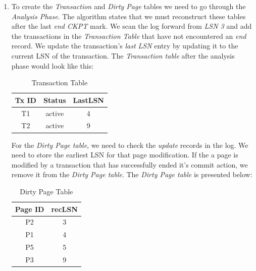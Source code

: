 \documentclass{article}      %
\begin{document}
\begin{enumerate}
\item %

To create the \emph{Transaction} and \emph{Dirty Page} tables we need to go through the \emph{Analysis Phase}. The algorithm states that we must reconstruct these tables after the last \emph{end CKPT} mark. We scan the log forward from \emph{LSN 3} and add the transactions in the \emph{Transaction Table} that have not encountered an \emph{end} record. We update the transaction's  \emph{last LSN} entry by updating it to the current LSN of the transaction. The \emph{Transaction table} after the analysis phase would look like this: \\

\begin{table}[h]
\begin{center}
\begin{tabular}{|c|c|c|}
\hline
\textbf{Tx ID} & \textbf{Status} & \textbf{LastLSN} \\ \hline
T1             & active          & 4                \\ 
T2             & active          & 9                \\ \hline
\end{tabular}
\caption{Transaction Table}
\label{Transaction Table}
\end{center}
\end{table}

For the \emph{Dirty Page table}, we need to check the \emph{update} records in the log. We need to store the earliest LSN for that page modification. If the a page is modified by a transaction that has successfully ended it's commit action, we remove it from the \emph{Dirty Page table}. The \emph{Dirty Page table} is presented below:\\

\begin{table}[h]
\begin{center}
\begin{tabular}{|c|c|}
\hline
\textbf{Page ID} & \textbf{recLSN} \\ 
\hline
P2               & 3               \\
P1               & 4               \\
P5               & 5               \\ 
P3               & 9               \\ 
\hline
\end{tabular}
\caption{Dirty Page Table}
\label{Dirty Page Table}
\end{center}
\end{table}


\end{enumerate}
\end{document}
